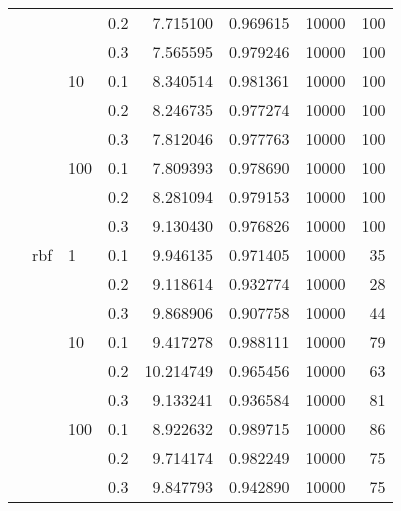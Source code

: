 \begin{table}[H]
\begin{tabular}{llllrrrr}
           &     &     & 0.2 &   7.715100 &  0.969615 &   10000 &   100 \\
           &     &     & 0.3 &   7.565595 &  0.979246 &   10000 &   100 \\
           &     & 10  & 0.1 &   8.340514 &  0.981361 &   10000 &   100 \\
           &     &     & 0.2 &   8.246735 &  0.977274 &   10000 &   100 \\
           &     &     & 0.3 &   7.812046 &  0.977763 &   10000 &   100 \\
           &     & 100 & 0.1 &   7.809393 &  0.978690 &   10000 &   100 \\
           &     &     & 0.2 &   8.281094 &  0.979153 &   10000 &   100 \\
           &     &     & 0.3 &   9.130430 &  0.976826 &   10000 &   100 \\
           & rbf & 1   & 0.1 &   9.946135 &  0.971405 &   10000 &    35 \\
           &     &     & 0.2 &   9.118614 &  0.932774 &   10000 &    28 \\
           &     &     & 0.3 &   9.868906 &  0.907758 &   10000 &    44 \\
           &     & 10  & 0.1 &   9.417278 &  0.988111 &   10000 &    79 \\
           &     &     & 0.2 &  10.214749 &  0.965456 &   10000 &    63 \\
           &     &     & 0.3 &   9.133241 &  0.936584 &   10000 &    81 \\
           &     & 100 & 0.1 &   8.922632 &  0.989715 &   10000 &    86 \\
           &     &     & 0.2 &   9.714174 &  0.982249 &   10000 &    75 \\
           &     &     & 0.3 &   9.847793 &  0.942890 &   10000 &    75 \\
\bottomrule
\end{tabular}
\end{table}
